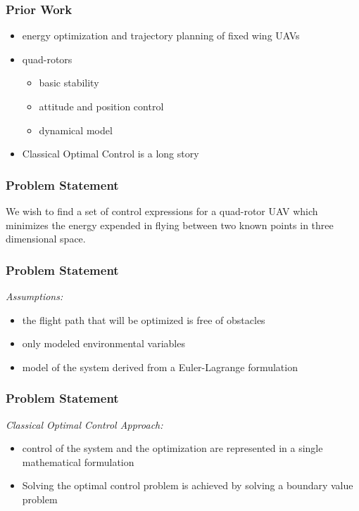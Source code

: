 \documentclass{beamer}
\begin{document}

\begin{frame}
\frametitle{Prior Work}
\begin{itemize}
\item energy optimization and trajectory planning of fixed wing UAVs
\item quad-rotors
	\begin{itemize}
		\item basic stability
		\item attitude and position control
        \item dynamical model
    \end{itemize}    
\item Classical Optimal Control is a long story
\end{itemize}
\end{frame}


\begin{frame}
\frametitle{Problem Statement}

We wish to find a set of control expressions for a quad-rotor UAV which minimizes the energy expended in flying between two known points in three dimensional space.
\end{frame}

\begin{frame}
\frametitle{Problem Statement}
\textit{Assumptions:}
\begin{itemize}
\item the flight path that will be optimized is free of obstacles
\item only modeled environmental variables
\item model of the system derived from a Euler-Lagrange formulation
\end{itemize}
\end{frame}

\begin{frame}
\frametitle{Problem Statement}

\textit{Classical Optimal Control Approach:}

\begin{itemize}
	\item control of the system and the optimization are represented in a single mathematical formulation
	\item Solving the optimal control problem is achieved by solving a boundary value problem
\end{itemize}

\end{frame}
\end{document}

